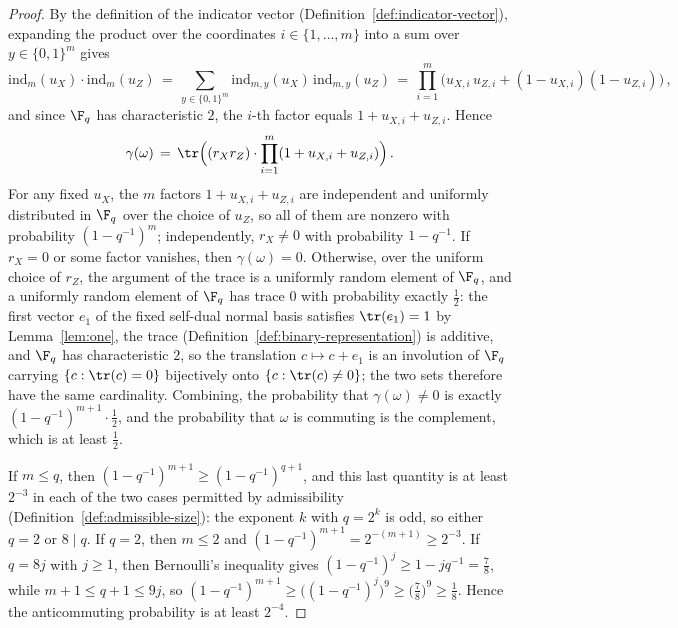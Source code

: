 \begin{proof}
	\leanok
	By the definition of the indicator vector
	(Definition~\ref{def:indicator-vector}), expanding the product over the
	coordinates $i \in \{1, \dots, m\}$ into a sum over $y \in \{0,1\}^m$
	gives
	\[
		\mathrm{ind}_m(u_X) \cdot \mathrm{ind}_m(u_Z)
		\,=\, \sum_{y \in \{0,1\}^m} \mathrm{ind}_{m,y}(u_X)\, \mathrm{ind}_{m,y}(u_Z)
		\,=\, \prod_{i=1}^{m} \big( u_{X,i}\, u_{Z,i} + (1 - u_{X,i})(1 - u_{Z,i}) \big)\,,
	\]
	and since $\F_q$ has characteristic $2$, the $i$-th factor equals
	$1 + u_{X,i} + u_{Z,i}$. Hence
	\[
		\gamma(\omega) \,=\, \tr\Big( (r_X r_Z) \cdot \prod_{i=1}^{m} (1 + u_{X,i} + u_{Z,i}) \Big)\,.
	\]
	For any fixed $u_X$, the $m$ factors $1 + u_{X,i} + u_{Z,i}$ are
	independent and uniformly distributed in $\F_q$ over the choice of
	$u_Z$, so all of them are nonzero with probability $(1-q^{-1})^m$;
	independently, $r_X \neq 0$ with probability $1 - q^{-1}$. If $r_X = 0$
	or some factor vanishes, then $\gamma(\omega) = 0$. Otherwise, over the
	uniform choice of $r_Z$, the argument of the trace is a uniformly random
	element of $\F_q$, and a uniformly random element of $\F_q$ has trace
	$0$ with probability exactly $\frac12$: the first vector $e_1$ of the
	fixed self-dual normal basis satisfies $\tr(e_1) = 1$ by
	Lemma~\ref{lem:one}, the trace
	(Definition~\ref{def:binary-representation}) is additive, and $\F_q$
	has characteristic $2$, so the translation $c \mapsto c + e_1$ is an
	involution of $\F_q$ carrying $\{c : \tr(c) = 0\}$ bijectively onto
	$\{c : \tr(c) \neq 0\}$; the two sets therefore have the same
	cardinality. Combining, the probability that
	$\gamma(\omega) \neq 0$ is exactly $(1-q^{-1})^{m+1} \cdot \frac12$, and
	the probability that $\omega$ is commuting is the complement, which is
	at least $\frac12$.

	If $m \leq q$, then $(1-q^{-1})^{m+1} \geq (1-q^{-1})^{q+1}$, and this
	last quantity is at least $2^{-3}$ in each of the two cases permitted
	by admissibility (Definition~\ref{def:admissible-size}): the exponent
	$k$ with $q = 2^k$ is odd, so either $q = 2$ or $8 \mid q$. If $q = 2$,
	then $m \leq 2$ and $(1-q^{-1})^{m+1} = 2^{-(m+1)} \geq 2^{-3}$. If
	$q = 8j$ with $j \geq 1$, then Bernoulli's inequality gives
	$(1-q^{-1})^{j} \geq 1 - j q^{-1} = \frac78$, while
	$m + 1 \leq q + 1 \leq 9j$, so
	$(1-q^{-1})^{m+1} \geq \big( (1-q^{-1})^{j} \big)^{9} \geq \big( \frac78 \big)^{9} \geq \frac18$.
	Hence the anticommuting probability is at least $2^{-4}$.


\end{proof}
